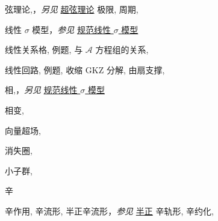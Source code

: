 \begin{theindex}
\indexspace
\item \leavevmode\hypertarget{idx:1287}{弦理论},\enspace{}，\textit{另见} \hyperlink{idx:1304}{超弦理论}
\subitem \leavevmode\hypertarget{idx:1288}{极限},\enspace{}
\subitem \leavevmode\hypertarget{idx:1289}{周期},\enspace{}
\indexspace
\item \leavevmode\hypertarget{idx:0721}{线性 $\sigma$ 模型}，\textit{参见} \hyperlink{idx:0354}{规范线性 $\sigma$ 模型}
\indexspace
\item \leavevmode\hypertarget{idx:0700}{线性关系格},\enspace{}
\subitem \leavevmode\hypertarget{idx:0701}{例题},\enspace{}
\subitem \leavevmode\hypertarget{idx:0702}{与 $\mathcal A$ 方程组的关系},\enspace{}
\indexspace
\item \leavevmode\hypertarget{idx:0717}{线性回路},\enspace{}
\subitem \leavevmode\hypertarget{idx:0718}{例题},\enspace{}
\subitem \leavevmode\hypertarget{idx:0719}{收缩 GKZ 分解},\enspace{}
\subitem \leavevmode\hypertarget{idx:0720}{由扇支撑},\enspace{}
\indexspace
\item \leavevmode\hypertarget{idx:1042}{相},\enspace{}，\textit{另见} \hyperlink{idx:0354}{规范线性 $\sigma$ 模型}
\indexspace
\item \leavevmode\hypertarget{idx:1041}{相变},\enspace{}
\indexspace
\item \leavevmode\hypertarget{idx:1397}{向量超场},\enspace{}
\indexspace
\item \leavevmode\hypertarget{idx:1387}{消失圈},\enspace{}
\indexspace
\item \leavevmode\hypertarget{idx:1264}{小子群},\enspace{}
\indexspace
\item \leavevmode\hypertarget{idx:1318}{辛}
\subitem \leavevmode\hypertarget{idx:1319}{辛作用},\enspace{}
\subitem \leavevmode\hypertarget{idx:1320}{辛流形},\enspace{}
\subsubitem \leavevmode\hypertarget{idx:1321}{半正辛流形}，\textit{参见} \hyperlink{idx:1245}{半正}
\subitem \leavevmode\hypertarget{idx:1322}{辛轨形},\enspace{}
\subitem \leavevmode\hypertarget{idx:1323}{辛约化},\enspace{}

\end{theindex}
